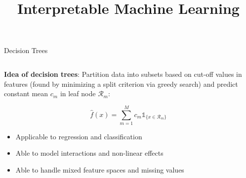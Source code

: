 \documentclass[11pt,compress,t,notes=noshow, aspectratio=169, xcolor=table]{beamer}
\title{Interpretable Machine Learning}
\date{}
\begin{document}
\newcommand{\titlefigure}{figure/decision.png}
\newcommand{\learninggoals}{
\item Decision trees
\item RuleFit
\item Decision rules}



\begin{frame}{Decision Trees }


\begin{columns}[T, totalwidth=\textwidth]

\begin{column}{0.7\textwidth}
\textbf{Idea of decision trees}: 
Partition data into subsets based on cut-off values in features (found by minimizing a split criterion via greedy search) and predict constant mean $c_m$ in leaf node $\mathcal{R}_m$:

$$
\hat f(x) = \sum_{m=1}^M c_m \mathds{1}_{\{x \in \mathcal{R}_m\}}
$$

\pause
\begin{itemize}
    \item Applicable to regression and classification
    \item Able to model interactions and non-linear effects
    \item Able to handle mixed feature spaces and missing values
\end{itemize}


\end{column}
\end{columns}
\end{frame}
\end{document}

